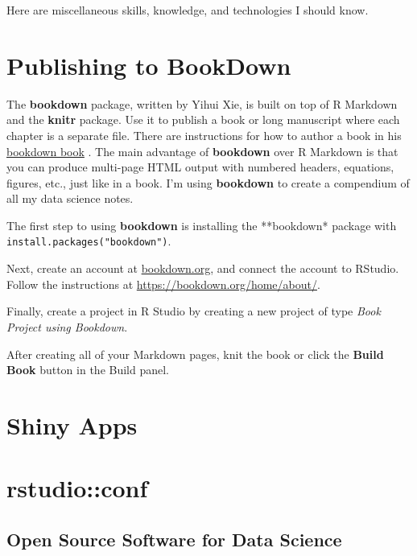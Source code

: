 \documentclass[]{book}
\begin{document}
Here are miscellaneous skills, knowledge, and technologies I should know.

\hypertarget{publishing-to-bookdown}{%
\chapter*{Publishing to BookDown}\label{publishing-to-bookdown}}

The \textbf{bookdown} package, written by Yihui Xie, is built on top of R Markdown and the \textbf{knitr} package. Use it to publish a book or long manuscript where each chapter is a separate file. There are instructions for how to author a book in his \href{https://bookdown.org/yihui/bookdown/}{bookdown book} \citep{xie2019}. The main advantage of \textbf{bookdown} over R Markdown is that you can produce multi-page HTML output with numbered headers, equations, figures, etc., just like in a book. I'm using \textbf{bookdown} to create a compendium of all my data science notes.

The first step to using \textbf{bookdown} is installing the **bookdown* package with \texttt{install.packages("bookdown")}.

Next, create an account at \href{http://bookdown.org}{bookdown.org}, and connect the account to RStudio. Follow the instructions at \url{https://bookdown.org/home/about/}.

Finally, create a project in R Studio by creating a new project of type \emph{Book Project using Bookdown}.

After creating all of your Markdown pages, knit the book or click the \textbf{Build Book} button in the Build panel.

\hypertarget{shiny-apps}{%
\chapter*{Shiny Apps}\label{shiny-apps}}

\hypertarget{rstudioconf}{%
\chapter{rstudio::conf}\label{rstudioconf}}

\hypertarget{open-source-software-for-data-science}{%
\section{Open Source Software for Data Science}\label{open-source-software-for-data-science}}
\end{document}
